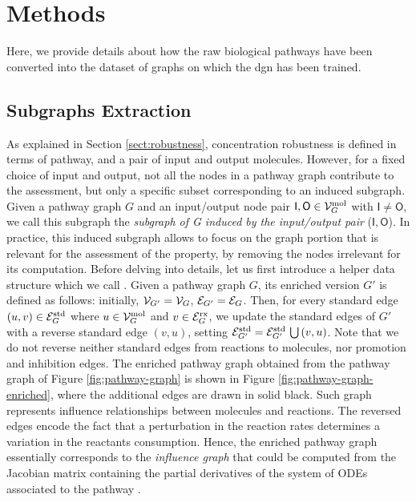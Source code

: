 \section{Methods}
Here, we provide details about how the raw biological pathways have been converted into the dataset of graphs on which the \gls{dgn} has been trained.

\subsection{Subgraphs Extraction}\label{sec:subgraphs-extraction}
As explained in Section \ref{sect:robustness}, concentration robustness is defined in terms of pathway, and a pair of input and output molecules. However, for a fixed choice of input and output, not all the nodes in a pathway graph contribute to the assessment, but only a specific subset corresponding to an induced subgraph. Given a pathway graph $G$ and an input/output node pair $\mathsf{I}, \mathsf{O} \in \Cal{V}_G^{\Fun{mol}}$ with $\mathsf{I} \neq \mathsf{O}$, we call this subgraph the \emph{subgraph of G induced by the input/output pair} ($\mathsf{I}, \mathsf{O}$). In practice, this induced subgraph allows to focus on the graph portion that is relevant for the assessment of the property, by removing the nodes irrelevant for its computation. Before delving into details, let us first introduce a helper data structure which we call . Given a pathway graph $G$, its enriched version $G'$ is defined as follows: initially, $\Cal{V}_{G'}=\Cal{V}_G$, $\Cal{E}_{G'}=\Cal{E}_G$. Then, for every standard edge $(u, v) \in \Cal{E}_{G}^{\Fun{std}}$ where $u \in \Cal{V}_{G}^{\Fun{mol}}$ and $v \in \Cal{E}_{G}^{\Fun{rx}}$, we update the standard edges of $G'$ with a reverse standard edge $(v,u)$, setting $\Cal{E}_{G'}^{\Fun{std}} = \Cal{E}_{G'}^{\Fun{std}} \Union (v, u)$. Note that we do not reverse neither standard edges from reactions to molecules, nor promotion and inhibition edges. The enriched pathway graph obtained from the pathway graph of Figure \ref{fig:pathway-graph} is shown in Figure \ref{fig:pathway-graph-enriched}, where the additional edges are drawn in solid black. Such graph represents influence relationships between molecules and reactions. The reversed edges encode the fact that a perturbation in the reaction rates determines a variation in the reactants consumption. Hence, the enriched pathway graph essentially corresponds to the \emph{influence graph} that could be computed from the Jacobian matrix containing the partial derivatives of the system of ODEs associated to the pathway \cite{?}.
